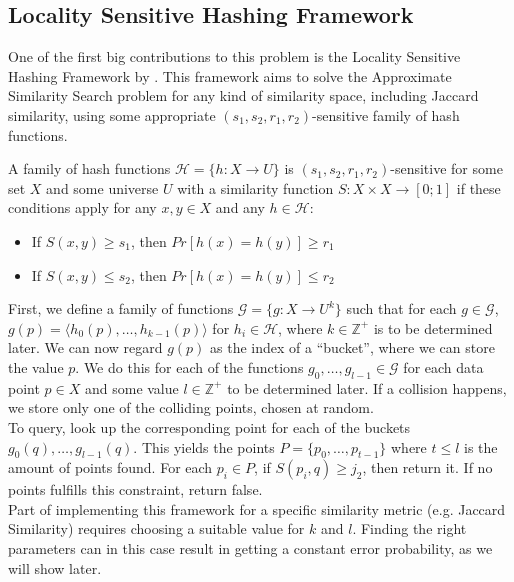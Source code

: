 \subsection{Locality Sensitive Hashing Framework}
One of the first big contributions to this problem is the Locality Sensitive Hashing Framework by \citet{Indyk1998ApproximateNN}. This framework aims to solve the Approximate Similarity Search problem for any kind of similarity space, including Jaccard similarity, using some appropriate $(s_1, s_2, r_1, r_2)$-sensitive family of hash functions.
\begin{definition}
\label{thm:sensitive-hash}
A family of hash functions $\mathcal{H}=\{h\colon X\rightarrow U\}$ is $(s_1, s_2, r_1, r_2)$-sensitive for some set $X$ and some universe $U$ with a similarity function $S\colon X\times X \rightarrow [0;1]$ if these conditions apply for any $x,y \in X$ and any $h \in \mathcal{H}$:
\begin{itemize}
    \item If $S(x,y) \geq s_1$, then $Pr[h(x)=h(y)] \geq r_1$
    \item If $S(x,y) \leq s_2$, then $Pr[h(x)=h(y)] \leq r_2$
\end{itemize}
\end{definition}
First, we define a family of functions $\mathcal{G}=\{g\colon X \rightarrow U^k \}$ such that for each $g\in \mathcal{G}$, $g(p)=\langle h_0(p), \dots, h_{k-1}(p)\rangle$ for $h_i\in \mathcal{H}$, where $k\in \mathbb{Z}^+$ is to be determined later. We can now regard $g(p)$ as the index of a ``bucket'', where we can store the value $p$. We do this for each of the functions $g_0, \dots, g_{l-1} \in \mathcal{G}$ for each data point $p\in X$ and some value $l\in \mathbb{Z}^+$ to be determined later. If a collision happens, we store only one of the colliding points, chosen at random.\\
To query, look up the corresponding point for each of the buckets $g_0(q), \dots, g_{l-1}(q)$. This yields the points $P=\{p_0, \dots, p_{t-1}\}$ where $t\leq l$ is the amount of points found. For each $p_i \in P$, if $S(p_i, q) \geq j_2$, then return it. If no points fulfills this constraint, return false.\\
Part of implementing this framework for a specific similarity metric (e.g. Jaccard Similarity) requires choosing a suitable value for $k$ and $l$. Finding the right parameters can in this case result in getting a constant error probability, as we will show later.
